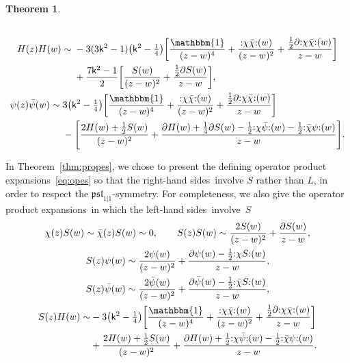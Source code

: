 \documentclass[pdftex]{sigma}
\numberwithin{equation}{section}
\newcommand{\pd}{\partial} %
\newcommand{\wun}{\mathbbm{1}} %
\newcommand{\bchi}{\bar{\chi}{}} %
\newcommand{\bpsi}{\bar{\psi}{}} %
\newcommand{\kk}{\mathsf{k}} %
\DeclarePairedDelimiter{\brac}{\lparen}{\rparen} %
\DeclarePairedDelimiter{\sqbrac}{\lbrack}{\rbrack} %
\newcommand{\no}[1]{\mathopen{:} #1 \mathclose{:}} %
\newcommand{\alg}[1]{\mathfrak{#1}} %
\newcommand{\SLSA}[3]{\alg{#1}_{#2 \vert #3}} %
\newcommand{\pslone}{\SLSA{psl}{1}{1}}
\newcommand{\lhs}{left-hand side}
\newcommand{\lhss}{\lhs s}
\newcommand{\rhs}{right-hand side}
\newcommand{\rhss}{\rhs s}
\newcommand{\ope}{operator product expansion}
\newcommand{\opes}{\ope s}
\newtheorem{Theorem}{Theorem}[section]
\begin{document}
\begin{Theorem}
\begin{subequations}
\begin{gather}
\begin{aligned}
			\end{aligned}
			\\
			\begin{aligned}
				H(z) H(w) \sim{} & -3(3\kk^2-1)\brac*{\kk^2-\tfrac{1}{4}} \sqbrac*{\frac{\wun}{(z-w)^4} + \frac{\no{\chi\bchi}(w)}{(z-w)^2} + \frac{\frac{1}{2}\pd\no{\chi\bchi}(w)}{z-w}} \\
				& + \frac{7\kk^2-1}{2} \sqbrac*{\frac{S(w)}{(z-w)^2} + \frac{\frac{1}{2}\pd S(w)}{z-w}},
			\end{aligned}
			\\
			\begin{aligned}
				\psi(z) \bpsi(w) \sim{} & 3\brac*{\kk^2-\tfrac{1}{4}} \sqbrac*{\frac{\wun}{(z-w)^4} + \frac{\no{\chi\bchi}(w)}{(z-w)^2} + \frac{\frac{1}{2}\pd\no{\chi\bchi}(w)}{z-w}}
				\\
				& - \sqbrac*{\frac{2H(w)+\frac{1}{2}S(w)}{(z-w)^2} + \frac{\pd H(w)+\frac{1}{4}\pd S(w)-\frac{1}{2}\no{\chi\bpsi}(w)-\frac{1}{2}\no{\bchi\psi}(w)}{z-w}}.
			\end{aligned}
		\end{gather}
	\end{subequations}
\end{Theorem}

In Theorem~\ref{thm:propes}, we chose to present the defining \opes\ \eqref{eq:opes} so that the \rhss\ involve $S$ rather than $L$, in order to respect the $\pslone$-symmetry.
For completeness, we also give the \opes\ in which the \lhss\ involve~$S$%
\begin{subequations} \label{eq:opesS}
	\begin{gather}
		\chi(z) S(w) \sim \bchi(z) S(w) \sim 0, \qquad
		S(z) S(w) \sim \frac{2S(w)}{(z-w)^2} + \frac{\pd S(w)}{z-w},
		\\
		\begin{aligned}
			S(z) \psi(w) &\sim \frac{2\psi(w)}{(z-w)^2} + \frac{\pd\psi(w) - \frac{1}{2}\no{\chi S}(w)}{z-w}, \\
			S(z) \bpsi(w) &\sim \frac{2\bpsi(w)}{(z-w)^2} + \frac{\pd\bpsi(w) - \frac{1}{2}\no{\bchi S}(w)}{z-w},
		\end{aligned}
		\\
		\begin{aligned}[b]
			S(z) H(w) \sim& -3\brac*{\kk^2-\tfrac{1}{4}}\sqbrac*{\frac{\wun}{(z-w)^4} + \frac{\no{\chi\bchi}(w)}{(z-w)^2} + \frac{\frac{1}{2}\pd\no{\chi\bchi}(w)}{z-w}} \\
			&+ \frac{2H(w) + \frac{1}{2}S(w)}{(z-w)^2} + \frac{\pd H(w) + \frac{1}{2}\no{\chi\bpsi}(w) - \frac{1}{2}\no{\bchi\psi}(w)}{z-w}.
		\end{aligned}
	\end{gather}
\end{subequations}
\end{document}
